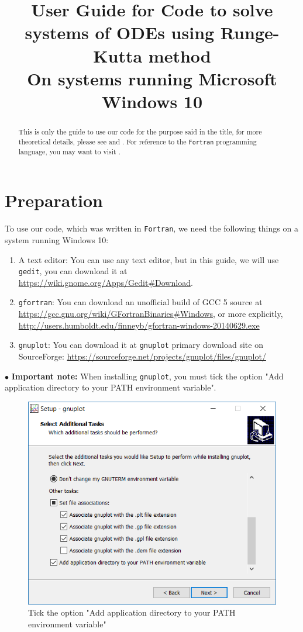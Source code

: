 \documentclass{article}
\begin{document}
	\title{User Guide for Code to solve systems of ODEs using Runge-Kutta method\\On systems running Microsoft Windows 10}
	\maketitle
	\begin{abstract}
		This is only the guide to use our code for the purpose said in the title, for more theoretical details, please see \cite{1} and \cite{2}. For reference to the \texttt{Fortran} programming language, you may want to visit \cite{3}.
	\end{abstract}
	\tableofcontents
	\newpage
	\noindent
	\section{Preparation}
	To use our code, which was written in \texttt{Fortran}, we need the following things on a system running Windows 10:
	\begin{enumerate}
		\item A text editor: You can use any text editor, but in this guide, we will use \texttt{gedit}, you can download it at \url{https://wiki.gnome.org/Apps/Gedit#Download}.
		\item \texttt{gfortran}: You can download an unofficial build of GCC 5 source at \url{https://gcc.gnu.org/wiki/GFortranBinaries#Windows}, or more explicitly, \url{http://users.humboldt.edu/finneyb/gfortran-windows-20140629.exe}
		\item \texttt{gnuplot}: You can download it at \texttt{gnuplot} primary download site on SourceForge: \url{https://sourceforge.net/projects/gnuplot/files/gnuplot/}
	\end{enumerate}
	\noindent$\bullet$ \textbf{Important note:} When installing \texttt{gnuplot}, you must tick the option "Add application directory to your PATH environment variable".
	\begin{figure}[H]
		\centering	\includegraphics[width=15cm]{figextra1}
		\caption{Tick the option "Add application directory to your PATH environment variable"}
	\end{figure}
\end{document}
